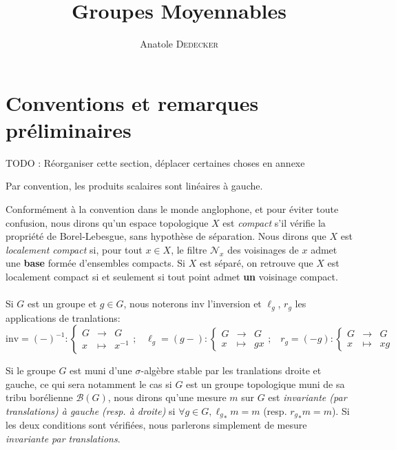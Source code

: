 \documentclass[a4paper,12pt]{article}
\newcommand{\Bor}{\mathcal{B}}
\newcommand\fundef[3]{#1: \left\{\begin{array}{ccc}#2\\#3\end{array}\right.}
\newcommand{\ssi}{si et seulement si }
\newcommand{\inv}{^{-1}}
\newcommand{\nhds}{\mathcal{N}}
\newcommand{\blank}{{-}}
\newcommand{\invop}{\mathrm{inv}}
\newcommand{\TODO}[1]{{\color{red}TODO :} #1}
\begin{document}
\begin{titlepage}
\title{Groupes Moyennables}
\author{Anatole \textsc{Dedecker}}
\maketitle
\thispagestyle{empty}
\end{titlepage}

\tableofcontents
\thispagestyle{empty}

\clearpage


\section*{Conventions et remarques préliminaires}

\TODO{Réorganiser cette section, déplacer certaines choses en annexe}

Par convention, les produits scalaires sont linéaires à gauche.

Conformément à la convention dans le monde anglophone, et pour éviter toute confusion, nous dirons qu'un espace topologique
$X$ est \emph{compact} s'il vérifie la propriété de Borel-Lebesgue, sans hypothèse de séparation. 
Nous dirons que $X$ est \emph{localement compact} si, pour tout $x\in X$, le filtre $\nhds_x$ des voisinages de $x$ admet
une \textbf{base} formée d'ensembles compacts. Si $X$ est séparé, on retrouve que $X$ est localement compact 
\ssi tout point admet \textbf{un} voisinage compact.

\paragraph{}
Si $G$ est un groupe et $g\in G$, nous noterons $\invop$ l'inversion et $\ell_g$, $r_g$ les applications de tranlations:
\begin{equation*}
    \fundef{\invop = (\blank)\inv}{G&\to& G}{x&\mapsto& x\inv}\text{;}\quad\fundef{\ell_g=(g\blank)}{G&\to& G}{x&\mapsto& gx}\text{;}\quad\fundef{r_g=(\blank g)}{G&\to& G}{x&\mapsto& xg}
\end{equation*}

Si le groupe $G$ est muni d'une $\sigma$-algèbre stable par les tranlations droite et gauche, ce qui sera notamment le cas
si $G$ est un groupe topologique muni de sa tribu borélienne $\Bor(G)$, nous dirons qu'une mesure $m$ sur $G$ est \textit{invariante
(par translations) à gauche (resp. à droite)} si $\forall g\in G, {\ell_g}_*m = m$ (resp. ${r_g}_*m = m$). Si les deux conditions
sont vérifiées, nous parlerons simplement de mesure \textit{invariante par translations}.
\end{document}
